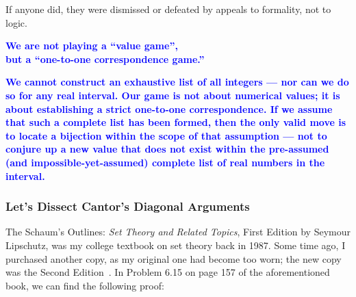 \documentclass[12pt]{article}
\theoremstyle{definition} %
\numberwithin{equation}{section}
\newcommand{\boldblu}[1]			    {\textbf{\textcolor{blue}{#1}}}
\begin{document}
\vspace{1em}
If anyone did, they were dismissed or defeated by appeals to formality, not to logic.

\begin{center}
\boldblu{We are not playing a “value game”,\\ but a “one-to-one correspondence game.”}
\end{center}
\boldblu{We cannot construct an exhaustive list of all integers — nor can we do so for any real interval. Our game is not about numerical values; it is about establishing a strict one-to-one correspondence. If we assume that such a complete list has been formed, then the only valid move is to locate a bijection within the scope of that assumption — not to conjure up a new value that does not exist within the pre-assumed (and impossible-yet-assumed) complete list of real numbers in the interval.}


\newpage
\subsubsection{Let's Dissect Cantor's Diagonal Arguments}
\label{sec:Dissect-Cantor-Diagonal-Arguments}

\vspace{1em}
The Schaum's Outlines: \textit{Set Theory and Related Topics}, First Edition by Seymour Lipschutz, was my college textbook on set theory back in 1987. Some time ago, I purchased another copy, as my original one had become too worn; the new copy was the Second Edition~\cite{lipschutz1998}. In Problem 6.15 on page 157 of the aforementioned book, we can find the following proof:
\end{document}
